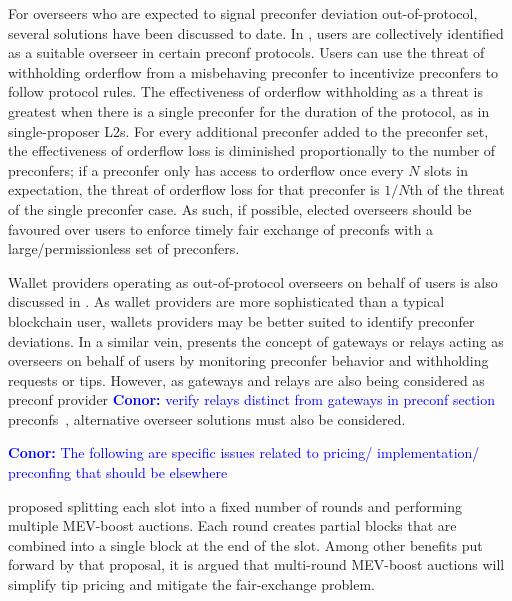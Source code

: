 \documentclass[a4paper]{article}
\theoremstyle{boldstyle}
\newcommand{\cm}[1]{\textcolor{blue}{\textbf{Conor:} #1}}
\begin{document}
    For overseers who are expected to signal preconfer deviation out-of-protocol, several solutions have been discussed to date. In \cite{W:PreconfirmationFairExchange}, users are collectively identified as a suitable overseer in certain preconf protocols. Users can use the threat of withholding orderflow from a misbehaving preconfer to incentivize preconfers to follow protocol rules. The effectiveness of orderflow withholding as a threat is greatest when there is a single preconfer for the duration of the protocol, as in single-proposer L2s. For every additional preconfer added to the preconfer set, the effectiveness of orderflow loss is diminished proportionally to the number of preconfers; if a preconfer only has access to orderflow once every $N$ slots in expectation, the threat of orderflow loss for that preconfer is $1/N$th of the threat of the single preconfer case. As such, if possible, elected overseers should be favoured over users to enforce timely fair exchange of preconfs with a large/permissionless set of preconfers. 
    
    Wallet providers operating as out-of-protocol overseers on behalf of users is also discussed in \cite{W:PreconfirmationFairExchange}. As wallet providers are more sophisticated than a typical blockchain user, wallets providers may be better suited to identify preconfer deviations.
    In a similar vein, \cite{W:ThePreconfirmationGatewayUnlockingPreconfirmations:FromUsertoPreconfer} presents the concept of gateways or relays acting as overseers on behalf of users by monitoring preconfer behavior and withholding requests or tips. However, as gateways and relays are also being considered as preconf provider \cm{verify relays distinct from gateways in preconf section} preconfs~\cite{W:ThePreconfirmationGatewayUnlockingPreconfirmations:FromUsertoPreconfer}, alternative overseer solutions must also be considered. 
    
    

    
    
    \cm{The following are specific issues related to pricing/ implementation/ preconfing that should be elsewhere}

    

    
    \cite{W:BasedPreconfirmationswithMulti-roundMEV-Boost} proposed splitting each slot into a fixed number of rounds and performing multiple MEV-boost auctions. Each round creates partial blocks that are combined into a single block at the end of the slot. Among other benefits put forward by that proposal, it is argued that multi-round MEV-boost auctions will simplify tip pricing and mitigate the fair-exchange problem.
    
\end{document}
